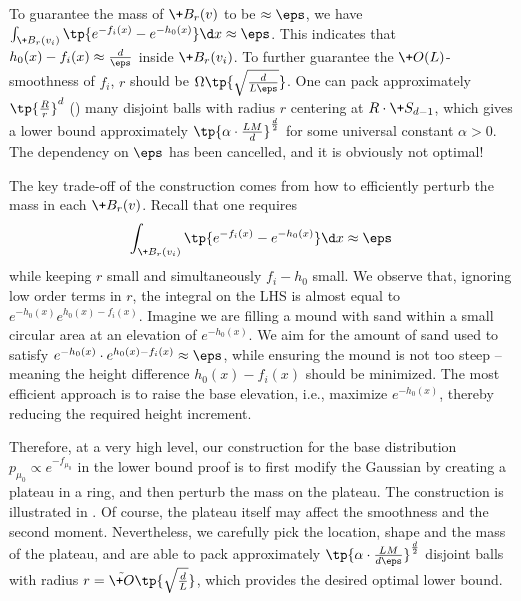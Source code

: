 \documentclass[11pt,a4paper]{article}
\begin{document}
To guarantee the mass of $\+B_r(v)$ to be $\approx \eps$, we have $\int_{\+B_r(v_i)} \tp{e^{-f_{i}(x) } - e^{-h_0(x)}} \d x \approx \eps$. This indicates that $h_0(x) -f_i(x) \approx \frac{d}{\eps}$ inside $\+B_r(v_i)$. To further guarantee the $\+O(L)$-smoothness of $f_i$, $r$ should be $\Omega\tp{\sqrt{\frac{d}{L\eps}}}$. One can pack approximately $\tp{\frac{R}{r}}^d$ () many disjoint balls with radius $r$ centering at $R\cdot \+S_{d-1}$, which gives a lower bound approximately $\tp{\alpha\cdot \frac{LM}{d}}^{\frac{d}{2}}$ for some universal constant $\alpha>0$. The dependency on $\eps$ has been cancelled, and it is obviously not optimal!

The key trade-off of the construction comes from how to efficiently perturb the mass in each $\+B_r(v)$. Recall that one requires
\[
    \int_{\+B_r(v_i)} \tp{e^{-f_{i}(x) } - e^{-h_0(x)}} \d x \approx \eps
\]
while keeping $r$ small and simultaneously $f_i - h_0$ small. We observe that, ignoring low order terms in $r$, the integral on the LHS is almost equal to $e^{-h_0(x)}e^{h_0(x)-f_i(x)}$. Imagine we are filling a mound with sand within a small circular area at an elevation of $ e^{-h_0(x)} $. We aim for the amount of sand used to satisfy $ e^{-h_0(x)} \cdot e^{h_0(x)-f_i(x)} \approx \eps $, while ensuring the mound is not too steep -- meaning the height difference \( h_0(x) - f_i(x) \) should be minimized. The most efficient approach is to raise the base elevation, i.e., maximize $e^{-h_0(x)}$, thereby reducing the required height increment.

Therefore, at a very high level, our construction for the base distribution $p_{\mu_0}\propto e^{-f_{\mu_0}}$ in the lower bound proof is to first modify the Gaussian by creating a plateau in a ring, and then perturb the mass on the plateau. The construction is illustrated in . Of course, the plateau itself may affect the smoothness and the second moment. Nevertheless, we carefully pick the location, shape and the mass of the plateau, and are able to pack approximately $\tp{\alpha\cdot \frac{LM}{d\eps}}^{\frac{d}{2}}$ disjoint balls with radius $r=\tilde{\+O}\tp{\sqrt{\frac{d}{L}}}$, which provides the desired optimal lower bound. 
\end{document}
